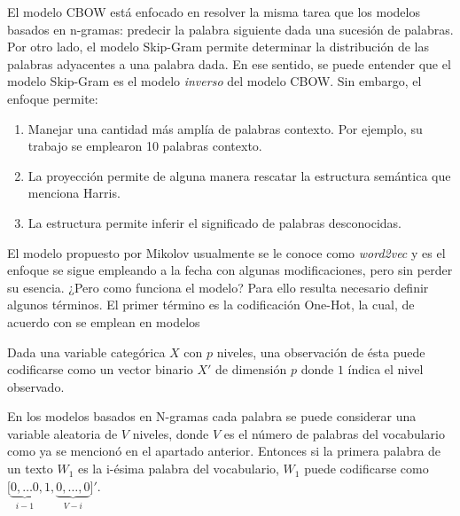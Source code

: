 El modelo CBOW está enfocado en resolver la misma tarea que los modelos basados en n-gramas: predecir la palabra siguiente dada una sucesión de palabras. Por otro lado, el modelo Skip-Gram permite determinar la distribución de las palabras adyacentes a una palabra dada. En ese sentido, se puede entender que el modelo Skip-Gram es el modelo \textit{inverso} del modelo CBOW. Sin embargo, el enfoque permite:
\begin{enumerate}
	\item Manejar una cantidad más amplía de palabras contexto. Por ejemplo, su trabajo se emplearon 10 palabras contexto.
	\item La proyección permite de alguna manera rescatar la estructura semántica que menciona Harris.
	\item La estructura permite inferir el significado de palabras desconocidas.
\end{enumerate}

El modelo propuesto por Mikolov usualmente se le conoce como \textit{word2vec} y es el enfoque se sigue empleando a la fecha con algunas modificaciones, pero sin perder su esencia. ¿Pero como funciona el modelo? Para ello resulta necesario definir algunos términos. El primer término es la codificación One-Hot, la cual, de acuerdo con \cite{bruce2020practical} se emplean en modelos

\begin{defi}
	\label{def:one-hot}
	Dada una variable categórica $X$ con $p$ niveles, una observación de ésta puede codificarse como un vector binario $X'$ de dimensión $p$ donde $1$ índica el nivel observado.
\end{defi}

En los modelos basados en N-gramas cada palabra se puede considerar una variable aleatoria de $V$ niveles, donde $V$ es el número de palabras del vocabulario como ya se mencionó en el apartado anterior. Entonces si la primera palabra de un texto $W_1$ es la i-ésima palabra del vocabulario, $W_1$ puede codificarse como $\bigl[\underbrace{0,\ldots0}_{i-1},1,\underbrace{0,\ldots,0}_{V-i}\bigr]'$.

